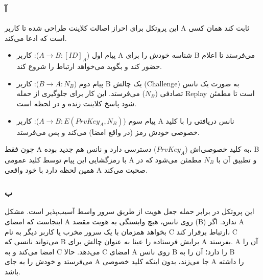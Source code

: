 
\subsubsection*{آ}
این پروتکل برای {احراز اصالت کلاینت} طراحی شده تا کاربر A ثابت کند همان کسی است که ادعا می‌کند.
\begin{itemize}
    \item {پیام اول ($A\rightarrow B:[ID]_{A}$):} کاربر A شناسه خودش را برای B می‌فرستد تا اعلام حضور کند و بگوید می‌خواهد ارتباط را شروع کند.
    \item {پیام دوم ($B\rightarrow A:N_{B}$):} کاربر B یک چالش (Challenge) به صورت یک نانس تصادفی ($N_B$) می‌فرستد. این کار برای جلوگیری از حمله Replay است تا مطمئن شود پاسخ کلاینت زنده و در لحظه است.
    \item {پیام سوم ($A\rightarrow B:E(PrvKey_{A},N_{B})$):} کاربر A نانس دریافتی را با کلید خصوصی خودش رمز (در واقع امضا) می‌کند و پس می‌فرستد. 
\end{itemize}
 چون فقط A به کلید خصوصی‌اش ($PrvKey_A$) دسترسی دارد و نانس هم جدید بوده، B با رمزگشایی این پیام توسط کلید عمومی A و تطبیق آن با $N_B$ مطمئن می‌شود که در همین لحظه دارد با خود واقعی A صحبت می‌کند.

\medskip
\subsubsection*{ب}
این پروتکل در برابر {حمله جعل هویت از طریق سرور واسط} آسیب‌پذیر است. مشکل اینجاست که امضای A روی نانس، هیچ وابستگی به هویت مقصد (B) ندارد. 
اگر A بخواهد همزمان با یک سرور مخرب یا کاربر دیگر به نام C ارتباط برقرار کند، C می‌تواند نانسی که B برایش فرستاده را عینا به عنوان چالش برای A بفرستد. A آن را امضا می‌کند و به C می‌دهد. حالا C امضای A روی نانس B را دارد؛ آن را به B می‌فرستد و خودش را به جای A جا می‌زند، بدون اینکه کلید خصوصی A را داشته باشد.




